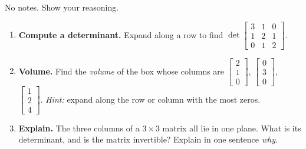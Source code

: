 \documentclass[10pt]{article}
\begin{document}
\namedateperiod

\vspace{0.15in}

No notes. Show your reasoning.

\begin{enumerate}[leftmargin=1.8em, itemsep=16pt]
  \item \textbf{Compute a determinant.} Expand along a row to find
        $\det\begin{bmatrix} 3 & 1 & 0 \\ 1 & 2 & 1 \\ 0 & 1 & 2 \end{bmatrix}$.
        \vspace{1.4cm}
  \item \textbf{Volume.} Find the \emph{volume} of the box whose columns are
        $\begin{bmatrix} 2 \\ 1 \\ 0 \end{bmatrix}$, $\begin{bmatrix} 0 \\ 3 \\ 0 \end{bmatrix}$,
        $\begin{bmatrix} 1 \\ 2 \\ 4 \end{bmatrix}$.
        \emph{Hint:} expand along the row or column with the most zeros.
        \vspace{1.4cm}
  \item \textbf{Explain.} The three columns of a $3\times3$ matrix all lie in one plane. What is its
        determinant, and is the matrix invertible? Explain in one sentence \emph{why}.
\end{enumerate}
\end{document}
